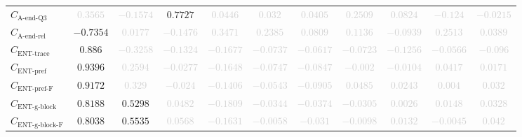 \documentclass{standalone}
\newcommand{\lastactivitiesrelname}{\text{A-end-rel}}
\newcommand{\lastactivitiesrel}{C_{\lastactivitiesrelname}}
\newcommand{\lastqthreename}{\text{A-end-Q3}}
\newcommand{\lastqthree}{C_{\lastqthreename}}
\newcommand{\enttracename}{\text{ENT-trace}}
\newcommand{\enttrace}{C_{\enttracename}}
\newcommand{\entprefixname}{\text{ENT-pref}}
\newcommand{\entprefix}{C_{\entprefixname}}
\newcommand{\entprefixflatname}{\text{ENT-pref-F}}
\newcommand{\entprefixflat}{C_{\entprefixflatname}}
\newcommand{\entgblockname}{\text{ENT-g-block}}
\newcommand{\entgblock}{C_{\entgblockname}}
\newcommand{\entgblockflatname}{\text{ENT-g-block-F}}
\newcommand{\entgblockflat}{C_{\entgblockflatname}}
\begin{document}
\begin{tabular}{lcccccccccc}
$\lastqthree$ & \textcolor{lightgray}{$0.3565$} & \textcolor{lightgray}{$-0.1574$} & $0.7727$ & \textcolor{lightgray}{$0.0446$} & \textcolor{lightgray}{$0.032$} & \textcolor{lightgray}{$0.0405$} & \textcolor{lightgray}{$0.2509$} & \textcolor{lightgray}{$0.0824$} & \textcolor{lightgray}{$-0.124$} & \textcolor{lightgray}{$-0.0215$} \\ 
$\lastactivitiesrel$ & $-0.7354$ & \textcolor{lightgray}{$0.0177$} & \textcolor{lightgray}{$-0.1476$} & \textcolor{lightgray}{$0.3471$} & \textcolor{lightgray}{$0.2385$} & \textcolor{lightgray}{$0.0809$} & \textcolor{lightgray}{$0.1136$} & \textcolor{lightgray}{$-0.0939$} & \textcolor{lightgray}{$0.2513$} & \textcolor{lightgray}{$0.0389$} \\ 
$\enttrace$ & $0.886$ & \textcolor{lightgray}{$-0.3258$} & \textcolor{lightgray}{$-0.1324$} & \textcolor{lightgray}{$-0.1677$} & \textcolor{lightgray}{$-0.0737$} & \textcolor{lightgray}{$-0.0617$} & \textcolor{lightgray}{$-0.0723$} & \textcolor{lightgray}{$-0.1256$} & \textcolor{lightgray}{$-0.0566$} & \textcolor{lightgray}{$-0.096$} \\ 
$\entprefix$ & $0.9396$ & \textcolor{lightgray}{$0.2594$} & \textcolor{lightgray}{$-0.0277$} & \textcolor{lightgray}{$-0.1648$} & \textcolor{lightgray}{$-0.0747$} & \textcolor{lightgray}{$-0.0847$} & \textcolor{lightgray}{$-0.002$} & \textcolor{lightgray}{$-0.0104$} & \textcolor{lightgray}{$0.0417$} & \textcolor{lightgray}{$0.0171$} \\ 
$\entprefixflat$ & $0.9172$ & \textcolor{lightgray}{$0.329$} & \textcolor{lightgray}{$-0.024$} & \textcolor{lightgray}{$-0.1406$} & \textcolor{lightgray}{$-0.0543$} & \textcolor{lightgray}{$-0.0905$} & \textcolor{lightgray}{$0.0485$} & \textcolor{lightgray}{$0.0243$} & \textcolor{lightgray}{$0.004$} & \textcolor{lightgray}{$0.032$} \\ 
$\entgblock$ & $0.8188$ & $0.5298$ & \textcolor{lightgray}{$0.0482$} & \textcolor{lightgray}{$-0.1809$} & \textcolor{lightgray}{$-0.0344$} & \textcolor{lightgray}{$-0.0374$} & \textcolor{lightgray}{$-0.0305$} & \textcolor{lightgray}{$0.0026$} & \textcolor{lightgray}{$0.0148$} & \textcolor{lightgray}{$0.0328$} \\ 
$\entgblockflat$ & $0.8038$ & $0.5535$ & \textcolor{lightgray}{$0.0568$} & \textcolor{lightgray}{$-0.1631$} & \textcolor{lightgray}{$-0.0058$} & \textcolor{lightgray}{$-0.031$} & \textcolor{lightgray}{$-0.0098$} & \textcolor{lightgray}{$0.0132$} & \textcolor{lightgray}{$-0.0045$} & \textcolor{lightgray}{$0.042$} \\ 

\end{tabular}
\end{document}

